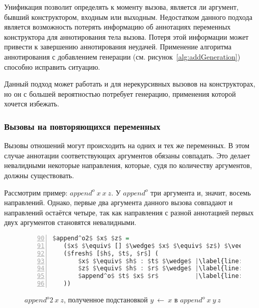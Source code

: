 Унификация позволит определять к моменту вызова, является ли аргумент, бывший конструктором, входным или выходным.
Недостатком данного подхода является возможность потерять информацию об аннотациях переменных конструктора для аннотирования тела вызова.
Потеря этой информации может привести к завершению аннотирования неудачей.
Применение алгоритма аннотирования с добавлением генерации (см. рисунок~\ref{alg:addGeneration}) способно исправить ситуацию.

Данный подход может работать и для нерекурсивных вызовов на конструкторах, но он с большей вероятностью потребует генерацию, применения которой хочется избежать.


\subsubsection{Вызовы на повторяющихся переменных}

Вызовы отношений могут происходить на одних и тех же переменных.
В этом случае аннотации соответствующих аргументов обязаны совпадать.
Это делает невалидными некоторые направления, которые, судя по количеству аргументов, должны существовать.

Рассмотрим пример: $append^o~x~x~z$.
У $append^o$ три аргумента и, значит, восемь направлений.
Однако, первые два аргумента данного вызова совпадают и направлений остаётся четыре, так как направления с разной аннотацией первых двух аргументов становятся невалидными.

\begin{figure}[h!]
  \begin{center}
  \begin{minipage}{0.45\textwidth}
  \begin{lstlisting}[language=Haskell, frame=single, numbers=left,numberstyle=\small, firstnumber=90, escapechar=|]
 $append^o2$ $x$ $z$ =
   ($x$ $\equiv$ [] $\wedge$ $x$ $\equiv$ $z$) $\vee$ |\label{line:appendo22}|
   ($fresh$ [$h$, $t$, $r$] (
       $x$ $\equiv$ $h$ : $t$ $\wedge$ |\label{line:appendo24}|
       $z$ $\equiv$ $h$ : $r$ $\wedge$ |\label{line:appendo25}|
       $append^o$ $t$ $x$ $r$          |\label{line:appendo26}|
   ))
    \end{lstlisting}
  \end{minipage}
  \end{center}
  \caption{$append^o2 \ x \ z$, полученное подстановкой $y~\gets~x$ в $append^o \ x \ y \ z$}
  \label{lst:appendo2}
\end{figure}


